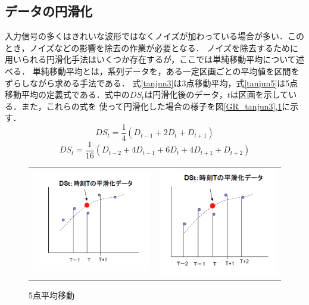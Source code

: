 \documentclass[a4paper,11pt]{jsarticle}
\begin{document}
\subsection{データの円滑化}
入力信号の多くはきれいな波形ではなくノイズが加わっている場合が多い．このとき，ノイズなどの影響を除去の作業が必要となる．
ノイズを除去するために用いられる円滑化手法はいくつか存在するが，ここでは単純移動平均について述べる．
単純移動平均とは，系列データを，ある一定区画ごとの平均値を区間をずらしながら求める手法である．
式\ref{tanjun3}は3点移動平均，式\ref{tanjun5}は5点移動平均の定義式である．式中の$DS_t$は円滑化後のデータ，$t$は区画を示している．また，これらの式を
使って円滑化した場合の様子を図\ref{GR_tanjun3},\ref{GR_tanjun5}に示す．
\begin{equation}
  DS_t = \frac{1}{4}(D_{t-1} + 2D_t + D_{t+1}) \label{tanjun3}
\end{equation}
\begin{equation}
  DS_t = \frac{1}{16}(D_{t-2} + 4D_{t-1} + 6D_t + 4D_{t+1} + D_{t+2}) \label{tanjun5}
\end{equation}
\begin{figure}[H]
  \begin{tabular}{cc}
    \begin{minipage}[t]{0.48\textwidth}
      \centering
      \includegraphics[clip,width=6cm]{picture/tanjun3.png}
      \caption{3点平均移動}
      \label{GR_tanjun3}
    \end{minipage} &
    \begin{minipage}[t]{0.48\textwidth}
      \centering
      \includegraphics[clip,width=6cm]{picture/tanjun5.png}
      \caption{5点平均移動}
      \label{GR_tanjun5}
    \end{minipage}
  \end{tabular}
\end{figure}
\end{document}
